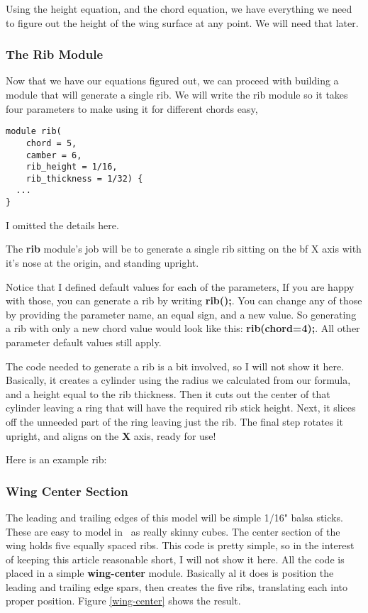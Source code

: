 Using the height equation, and the chord equation, we have everything we need
to figure out the height of the wing surface at any point. We will need  that
later.

\subsubsection{The Rib Module}

Now that we have our equations figured out, we can proceed with building a
module that will generate a single rib. We will write the rib module so it
takes four parameters to make using it for different chords easy,

\begin{lstlisting}
module rib(
    chord = 5,
    camber = 6,
    rib_height = 1/16,
    rib_thickness = 1/32) {
  ...
}
\end{lstlisting}

I omitted the details here.

The {\bf rib} module's job will be to generate a single rib sitting on the {bf X} axis
with it's nose at the origin, and standing upright.

Notice that I defined  default values for each of the parameters, If you are
happy with those, you can generate a rib by writing {\bf rib();}. You can
change any of those by providing the parameter name, an equal sign, and a new
value. So generating a rib with only a new chord value would look like this:
{\bf rib(chord=4);}. All other parameter default values still apply.

The code needed to generate a rib is a bit involved, so I will not show it
here. Basically, it creates a cylinder using the radius we calculated from our
formula, and a height equal to the rib thickness.  Then it cuts out the center
of that cylinder leaving a ring that will have the required rib stick height.
Next, it slices off the unneeded part of the ring leaving just the rib. The
final step rotates it upright, and aligns on the {\bf X} axis, ready for use!

Here is an example rib:


\subsubsection{Wing Center Section}

The leading and trailing edges of this model will be simple 1/16" balsa sticks.
These are easy to model in \osc\ as really skinny cubes. The center section of
the wing holds five equally spaced ribs. This code is pretty simple, so in the
interest of keeping this article reasonable short, I will not show it here. All
the code is placed in a simple {\bf wing-center} module. Basically al it does
is position the leading and trailing edge spars, then creates the five ribs,
translating each into proper position. Figure \ref {wing-center} shows the
result.

